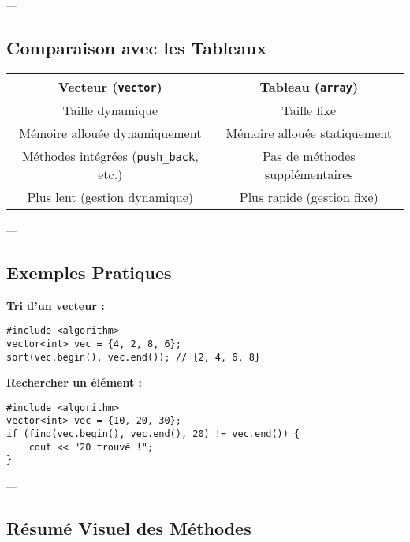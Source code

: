 ---

\subsection{ Comparaison avec les Tableaux}
\begin{center}
    \begin{tabular}{|c|c|}
        \hline
        \textbf{Vecteur (\texttt{vector})} & \textbf{Tableau (\texttt{array})} \\
        \hline
        Taille dynamique & Taille fixe \\
        Mémoire allouée dynamiquement & Mémoire allouée statiquement \\
        Méthodes intégrées (\texttt{push\_back}, etc.) & Pas de méthodes supplémentaires \\
        Plus lent (gestion dynamique) & Plus rapide (gestion fixe) \\
        \hline
    \end{tabular}
\end{center}

---

\subsection{ Exemples Pratiques}
\textbf{Tri d'un vecteur :}
\begin{tcolorbox}[colframe=blue!50!black, colback=blue!5!white, title=Exemple de Tri d'un Vecteur]
\begin{verbatim}
#include <algorithm>
vector<int> vec = {4, 2, 8, 6};
sort(vec.begin(), vec.end()); // {2, 4, 6, 8}
\end{verbatim}
\end{tcolorbox}

\textbf{Rechercher un élément :}
\begin{tcolorbox}[colframe=blue!50!black, colback=blue!5!white, title=Exemple de Recherche d'un Élément]
\begin{verbatim}
#include <algorithm>
vector<int> vec = {10, 20, 30};
if (find(vec.begin(), vec.end(), 20) != vec.end()) {
    cout << "20 trouvé !";
}
\end{verbatim}
\end{tcolorbox}

---

\subsection{ Résumé Visuel des Méthodes}
\begin{center}
\end{center}
